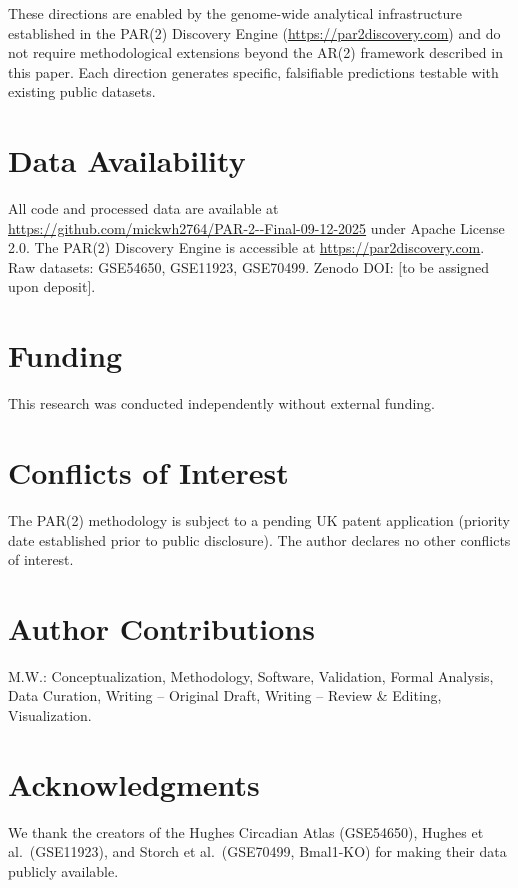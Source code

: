 \documentclass[11pt,letterpaper]{article}
\begin{document}
\noindent These directions are enabled by the genome-wide analytical infrastructure established in the PAR(2) Discovery Engine (\url{https://par2discovery.com}) and do not require methodological extensions beyond the AR(2) framework described in this paper. Each direction generates specific, falsifiable predictions testable with existing public datasets.

\section*{Data Availability}

All code and processed data are available at \url{https://github.com/mickwh2764/PAR-2--Final-09-12-2025} under Apache License 2.0. The PAR(2) Discovery Engine is accessible at \url{https://par2discovery.com}. Raw datasets: GSE54650, GSE11923, GSE70499. Zenodo DOI: [to be assigned upon deposit].

\section*{Funding}

This research was conducted independently without external funding.

\section*{Conflicts of Interest}

The PAR(2) methodology is subject to a pending UK patent application (priority date established prior to public disclosure). The author declares no other conflicts of interest.

\section*{Author Contributions}

M.W.: Conceptualization, Methodology, Software, Validation, Formal Analysis, Data Curation, Writing -- Original Draft, Writing -- Review \& Editing, Visualization.

\section*{Acknowledgments}

We thank the creators of the Hughes Circadian Atlas (GSE54650), Hughes et al.\ (GSE11923), and Storch et al.\ (GSE70499, Bmal1-KO) for making their data publicly available.
\end{document}
